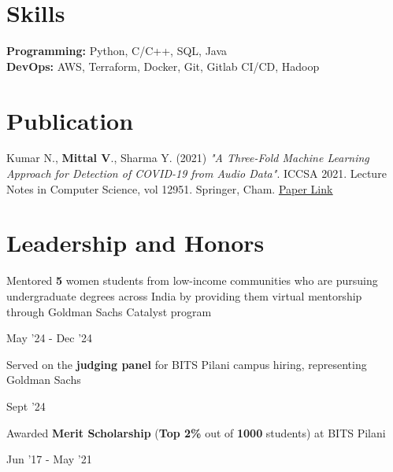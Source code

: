 \documentclass[a4paper]{Resume}
\begin{document}
\sectionsep{}


\sectionsep

\vspace{-6pt}
\section{Skills} 
\hrulefill

\pt \textbf{Programming:} Python, C/C++, SQL, Java \\
\pt \textbf{DevOps:} AWS, Terraform, Docker, Git, Gitlab CI/CD, Hadoop

\sectionsep
\vspace{-6pt}

  
\section{Publication}
\hrulefill

\pt Kumar N., \textbf{Mittal V}., Sharma Y. (2021) \textit{"A Three-Fold Machine Learning Approach for Detection of COVID-19 from Audio Data"}. ICCSA 2021. Lecture Notes in Computer Science, vol 12951. Springer, Cham. \href{https://doi.org/10.1007/978-3-030-86970-0_35}{\underline{Paper Link}} \\

\sectionsep


\section{Leadership and Honors} 
\hrulefill 

\begin{minipage}[t]{.8\textwidth}
	\pt Mentored \textbf{5} women students from low-income communities who are pursuing undergraduate degrees across India by providing them virtual mentorship through Goldman Sachs Catalyst program
\end{minipage}%
\begin{minipage}[t]{.2\textwidth}
	\hfill May '24 - Dec '24
\end{minipage}

\begin{minipage}[t]{.8\textwidth}
	\pt Served on the \textbf{judging panel} for BITS Pilani campus hiring, representing Goldman Sachs
\end{minipage}%
\begin{minipage}[t]{.2\textwidth}
	\hfill Sept '24
\end{minipage}


\begin{minipage}[t]{.8\textwidth}
	\pt Awarded \textbf{Merit Scholarship} (\textbf{Top 2\%} out of \textbf{1000} students) at BITS Pilani
\end{minipage}%
\begin{minipage}[t]{.2\textwidth}
	\hfill Jun '17 - May '21
\end{minipage}


\end{document}
